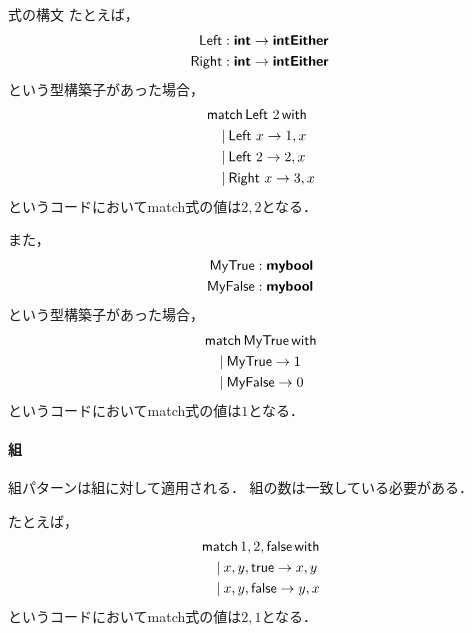 \documentclass[a4paper,titlepage,report,disablejfam]{jsbook}
\begin{document}
\begin{resbonsiblesection}{式の構文}{\sakamoto}
たとえば，
\begin{equation}
\begin{aligned}
\mathsf{Left} : \text{\sffamily\bfseries int}\rightarrow \text{\sffamily\bfseries intEither}\\
\mathsf{Right} : \text{\sffamily\bfseries int}\rightarrow \text{\sffamily\bfseries intEither}
\end{aligned}
\end{equation}
という型構築子があった場合，
\begin{equation}
\begin{aligned}
&\mathop{\mathsf{match}}\mathsf{Left}\ 2\mathop{\mathsf{with}} \\
&\quad \mathbin{|} \mathsf{Left}\ x\rightarrow 1,x \\
&\quad \mathbin{|} \mathsf{Left}\ 2\rightarrow 2,x \\
&\quad \mathbin{|} \mathsf{Right}\ x\rightarrow 3,x
\end{aligned}
\end{equation}
というコードにおいてmatch式の値は$2,2$となる．

また，
\begin{equation}
\begin{aligned}
\mathsf{MyTrue} : \text{\sffamily\bfseries mybool}\\
\mathsf{MyFalse} : \text{\sffamily\bfseries mybool}
\end{aligned}
\end{equation}
という型構築子があった場合，
\begin{equation}
\begin{aligned}
&\mathop{\mathsf{match}}\mathsf{MyTrue}\mathop{\mathsf{with}} \\
&\quad \mathbin{|} \mathsf{MyTrue}\rightarrow 1 \\
&\quad \mathbin{|} \mathsf{MyFalse}\rightarrow 0 \\
\end{aligned}
\end{equation}
というコードにおいてmatch式の値は$1$となる．

\paragraph{組}
組パターンは組に対して適用される．
組の数は一致している必要がある．

たとえば，
\begin{equation}
\begin{aligned}
&\mathop{\mathsf{match}}1,2,\mathsf{false}\mathop{\mathsf{with}} \\
&\quad \mathbin{|} x,y,\mathsf{true}\rightarrow x,y \\
&\quad \mathbin{|} x,y,\mathsf{false}\rightarrow y,x \\
\end{aligned}
\end{equation}
というコードにおいてmatch式の値は$2,1$となる．


\end{resbonsiblesection}
\end{document}
